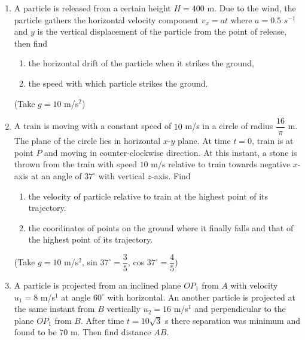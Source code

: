 \documentclass{article}
\renewcommand{\frac}[2]{\dfrac{#1}{#2}}
\begin{document}
\begin{enumerate}
    \item A particle is released from a certain height \( H = 400 \) m. Due to the wind, the particle gathers the horizontal velocity component \( v_x = at \) where \( a = 0.5 \) \( s^{-1} \) and \( y \) is the vertical displacement of the particle from the point of release, then find
    \begin{enumerate}
      \item the horizontal drift of the particle when it strikes the ground,
      \item the speed with which particle strikes the ground.
    \end{enumerate}
    (Take \( g = 10 \) m/s\(^2\))
  
    \item A train is moving with a constant speed of \( 10 \) m/s in a circle of radius \( \frac{16}{\pi} \) m. The plane of the circle lies in horizontal \( x \)-\( y \) plane. At time \( t = 0 \), train is at point \( P \) and moving in counter-clockwise direction. At this instant, a stone is thrown from the train with speed \( 10 \) m/s relative to train towards negative \( x \)-axis at an angle of \( 37^\circ \) with vertical \( z \)-axis. Find
    \begin{enumerate}
      \item the velocity of particle relative to train at the highest point of its trajectory.
      \item the coordinates of points on the ground where it finally falls and that of the highest point of its trajectory.
    \end{enumerate}
    (Take \( g = 10 \) m/s\(^2\), sin \( 37^\circ = \frac{3}{5} \), cos \( 37^\circ = \frac{4}{5} \))
  
    \item A particle is projected from an inclined plane \( OP_1 \) from \( A \) with velocity \( u_1 = 8 \) m/s\(^1 \) at angle \( 60^\circ \) with horizontal. An another particle is projected at the same instant from \( B \) vertically \( u_2 = 16 \) m/s\(^1 \) and perpendicular to the plane \( OP_1 \) from \( B \). After time \( t = 10\sqrt{3} \) s there separation was minimum and found to be \( 70 \) m. Then find distance \( AB \).
    \begin{center}
    \end{center}
  

\end{enumerate}
\end{document}
